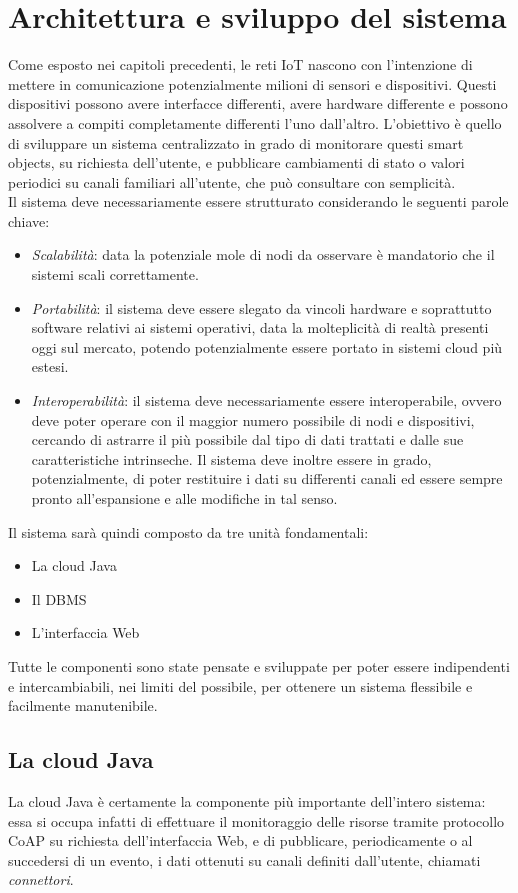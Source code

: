 \chapter{Architettura e sviluppo del sistema}
Come esposto nei capitoli precedenti, le reti IoT nascono con l'intenzione di mettere in comunicazione potenzialmente milioni di sensori e dispositivi. Questi dispositivi possono avere interfacce differenti, avere hardware differente e possono assolvere a compiti completamente differenti l'uno dall'altro. L'obiettivo è quello di sviluppare un sistema centralizzato in grado di monitorare questi smart objects, su richiesta dell'utente, e pubblicare cambiamenti di stato o valori periodici su canali familiari all'utente, che può consultare con semplicità.
\\Il sistema deve necessariamente essere strutturato considerando le seguenti parole chiave:
\begin{itemize}
\item \emph{Scalabilità}: data la potenziale mole di nodi da osservare è mandatorio che il sistemi scali correttamente.
\item \emph{Portabilità}: il sistema deve essere slegato da vincoli hardware e soprattutto software relativi ai sistemi operativi, data la molteplicità di realtà presenti oggi sul mercato, potendo potenzialmente essere portato in sistemi cloud più estesi.
\item \emph{Interoperabilità}: il sistema deve necessariamente essere interoperabile, ovvero deve poter operare con il maggior numero possibile di nodi e dispositivi, cercando di astrarre il più possibile dal tipo di dati trattati e dalle sue caratteristiche intrinseche. Il sistema deve inoltre essere in grado, potenzialmente, di poter restituire i dati su differenti canali ed essere sempre pronto all'espansione e alle modifiche in tal senso.
\end{itemize}
Il sistema sarà quindi composto da tre unità fondamentali:
\begin{itemize}
\item La cloud Java
\item Il DBMS
\item L'interfaccia Web
\end{itemize}
Tutte le componenti sono state pensate e sviluppate per poter essere indipendenti e intercambiabili, nei limiti del possibile, per ottenere un sistema flessibile e facilmente manutenibile.

\section{La cloud Java}
La cloud Java è certamente la componente più importante dell'intero sistema: essa si occupa infatti di effettuare il monitoraggio delle risorse tramite protocollo CoAP su richiesta dell'interfaccia Web, e di pubblicare, periodicamente o al succedersi di un evento, i dati ottenuti su canali definiti dall'utente, chiamati \textit{connettori}.

